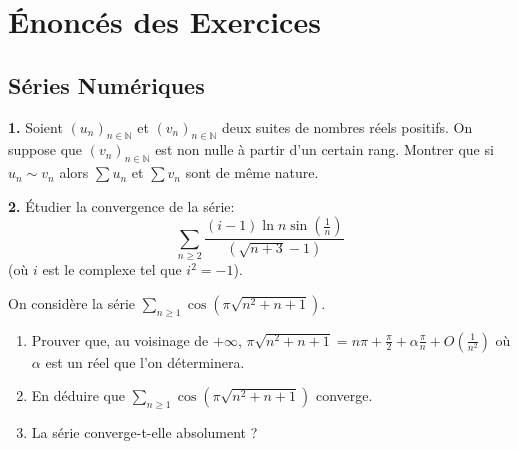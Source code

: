 \section{Énoncés des Exercices}

\subsection{Séries Numériques}

\begin{exercice}
\textbf{1.} Soient $(u_{n})_{n\in \mathbb{N}}$ et $(v_{n})_{n\in \mathbb{N}}$ deux suites de nombres réels positifs.
On suppose que $(v_{n})_{n\in \mathbb{N}}$ est non nulle à partir d'un certain rang.
Montrer que si $u_n \sim v_n$ alors $\sum u_n$ et $\sum v_n$ sont de même nature.

\textbf{2.} Étudier la convergence de la série:
$$ \sum_{n\ge2}\frac{(i-1)\ln n \sin(\frac{1}{n})}{(\sqrt{n+3}-1)} $$
(où $i$ est le complexe tel que $i^2 = -1$).
\end{exercice}

\begin{exercice}
On considère la série $\sum_{n\ge1}\cos(\pi\sqrt{n^{2}+n+1})$.
\begin{enumerate}
    \item Prouver que, au voisinage de $+\infty$, $\pi\sqrt{n^{2}+n+1}=n\pi+\frac{\pi}{2}+\alpha\frac{\pi}{n}+O(\frac{1}{n^{2}})$ où $\alpha$ est un réel que l'on déterminera.
    \item En déduire que $\sum_{n\ge1}\cos(\pi\sqrt{n^{2}+n+1})$ converge.
    \item La série converge-t-elle absolument ?
\end{enumerate}
\end{exercice}

